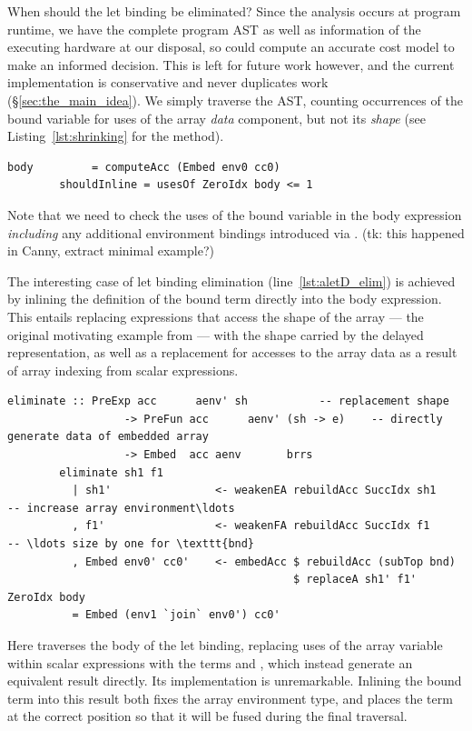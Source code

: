 When should the let binding be eliminated? Since the analysis occurs at program
runtime, we have the complete program AST as well as
information of the executing hardware at our disposal, so could compute an
accurate cost model to make an informed decision. This is left for future work
however, and the current implementation is conservative and never duplicates
work (\S\ref{sec:the_main_idea}). We simply traverse the AST, counting
occurrences of the bound variable for uses of the array \emph{data} component,
but not its \emph{shape} (see Listing~\ref{lst:shrinking} for the method).
%
\begin{lstlisting}[style=haskell,name=aletD]
        body         = computeAcc (Embed env0 cc0)
        shouldInline = usesOf ZeroIdx body <= 1
\end{lstlisting}
%
Note that we need to check the uses of the bound variable in the body expression
\emph{including} any additional environment bindings introduced via .
(tk: this happened in Canny, extract minimal example?)

The interesting case of let binding elimination (line~\ref{lst:aletD_elim}) is
achieved by inlining the definition of the bound term directly into the body
expression. This entails replacing expressions that access the shape of the
array --- the original motivating example from  --- with the
shape carried by the delayed representation, as well as a replacement for
accesses to the array data as a result of array indexing from scalar
expressions.
%
\begin{lstlisting}[style=haskell,name=aletD]
        eliminate :: PreExp acc      aenv' sh           -- replacement shape
                  -> PreFun acc      aenv' (sh -> e)    -- directly generate data of embedded array
                  -> Embed  acc aenv       brrs
        eliminate sh1 f1
          | sh1'                <- weakenEA rebuildAcc SuccIdx sh1      -- increase array environment\ldots
          , f1'                 <- weakenFA rebuildAcc SuccIdx f1       -- \ldots size by one for \texttt{bnd}
          , Embed env0' cc0'    <- embedAcc $ rebuildAcc (subTop bnd)
                                            $ replaceA sh1' f1' ZeroIdx body
          = Embed (env1 `join` env0') cc0'
\end{lstlisting}
%
Here  traverses the body of the let binding, replacing uses of
the array variable within scalar expressions with the terms  and
, which instead generate an equivalent result directly. Its
implementation is unremarkable. Inlining the bound term into this result both
fixes the array environment type, and places the term at the correct position so
that it will be fused during the final  traversal.

